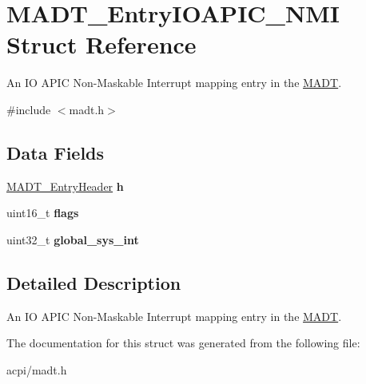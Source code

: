 \hypertarget{structMADT__EntryIOAPIC__NMI}{}\section{M\+A\+D\+T\+\_\+\+Entry\+I\+O\+A\+P\+I\+C\+\_\+\+N\+MI Struct Reference}
\label{structMADT__EntryIOAPIC__NMI}


An IO A\+P\+IC Non-\/\+Maskable Interrupt mapping entry in the \hyperlink{structMADT}{M\+A\+DT}.  




{\ttfamily \#include $<$madt.\+h$>$}

\subsection*{Data Fields}
\begin{DoxyCompactItemize}
\item 
\hyperlink{structMADT__EntryHeader}{M\+A\+D\+T\+\_\+\+Entry\+Header} {\bfseries h}\hypertarget{structMADT__EntryIOAPIC__NMI_a953d7799099f55e2b60c821adb7bab54}{}\label{structMADT__EntryIOAPIC__NMI_a953d7799099f55e2b60c821adb7bab54}

\item 
uint16\+\_\+t {\bfseries flags}\hypertarget{structMADT__EntryIOAPIC__NMI_a558bef26239ec815e29c3e917b97f979}{}\label{structMADT__EntryIOAPIC__NMI_a558bef26239ec815e29c3e917b97f979}

\item 
uint32\+\_\+t {\bfseries global\+\_\+sys\+\_\+int}\hypertarget{structMADT__EntryIOAPIC__NMI_a0dd03d99a753c6acfbbde995341f835a}{}\label{structMADT__EntryIOAPIC__NMI_a0dd03d99a753c6acfbbde995341f835a}

\end{DoxyCompactItemize}


\subsection{Detailed Description}
An IO A\+P\+IC Non-\/\+Maskable Interrupt mapping entry in the \hyperlink{structMADT}{M\+A\+DT}. 

The documentation for this struct was generated from the following file\+:\begin{DoxyCompactItemize}
\item 
acpi/madt.\+h\end{DoxyCompactItemize}
